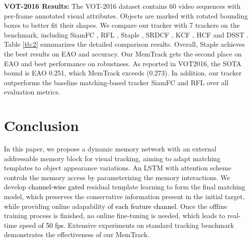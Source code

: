 \documentclass[runningheads]{llncs}
\newcommand{\abc}[1]{\textcolor{black}{#1}}
\newcommand{\abcn}[1]{\textcolor{black}{#1}}
\begin{document}
\textbf{VOT-2016 Results:} The VOT-2016 dataset contains 60 video sequences with per-frame annotated visual attributes. Objects are marked with rotated bounding boxes to better fit their shapes. We compare our tracker with 7 trackers on the benchmark, including SiamFC \cite{Bertinetto2016}, RFL \cite{Yang2017},  Staple \cite{Bertinetto2016-1}, SRDCF \cite{Danelljan2015}, KCF \cite{Henriques2015}, HCF \cite{Ma2015} and DSST \cite{Danelljan2014}.
Table \ref{tb:2} summarizes the detailed comparison results. Overall, Staple achieves the best results on EAO and accuracy. Our MemTrack gets the second place on EAO and best performance on robustness. As reported
in VOT2016, the SOTA bound is EAO 0.251, which
MemTrack exceeds (0.273). In addition, our tracker outperforms the baseline matching-based tracker SiamFC and RFL %
over all evaluation metrics. 


\section{Conclusion}
In this paper, we propose a dynamic memory network with an external addressable memory block for visual tracking, aiming to adapt matching templates to object appearance variations. %
An LSTM with attention scheme controls the memory access by parameterizing the memory interactions. We develop \abc{channel-wise gated} residual template learning to form the final matching model, which preserves the conservative information present in the initial target, while providing online adapability \abc{of each feature channel}. Once the offline training process is finished, no online fine-tuning %
is needed, %
which leads to real-time speed \abcn{of 50 fps}. Extensive experiments on standard tracking benchmark demonstrates the effectiveness %
of our MemTrack.

\clearpage



\end{document}
